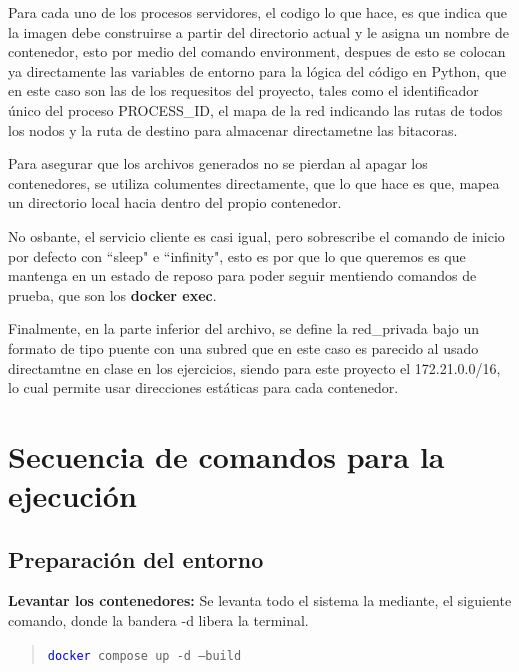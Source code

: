 \documentclass[letterpaper,11pt]{article}
\begin{document}
Para cada uno de los procesos servidores, el codigo lo que hace, es que indica que la imagen debe 
construirse a partir del directorio actual y le asigna un nombre de contenedor, esto por medio del comando 
environment, despues de esto se colocan ya directamente las variables de entorno 
para la lógica del código en Python, que en este caso son las de los requesitos del proyecto, tales como
el identificador único del proceso PROCESS\_ID, el mapa de la red indicando las rutas de todos los nodos
y la ruta de destino para almacenar directametne las bitacoras. 

Para asegurar que los archivos generados no se pierdan al apagar los contenedores, 
se utiliza columentes directamente, que lo que hace es que, mapea un directorio local hacia dentro del propio contenedor. 

No osbante, el servicio cliente es casi igual, pero sobrescribe el comando de inicio por defecto con 
``sleep" e ``infinity", esto es por que lo que queremos es que mantenga en un estado de reposo 
para poder seguir mentiendo comandos de prueba, que son los \textbf{docker exec}. 

Finalmente, en la parte inferior del archivo, se define la red\_privada bajo un formato de tipo puente
con una subred que en este caso es parecido al usado directamtne en clase en los ejercicios, siendo para este proyecto 
el 172.21.0.0/16, lo cual permite usar direcciones estáticas para cada contenedor.



\vspace{0.5cm}
\section{Secuencia de comandos para la ejecución}

\subsection{Preparación del entorno}

\textbf{Levantar los contenedores:}
Se levanta todo el sistema la mediante, el siguiente comando, donde la bandera -d libera la terminal.

\begin{quote}
\texttt{\textcolor{blue}{docker} compose up -d --build}
\end{quote}
\end{document}
